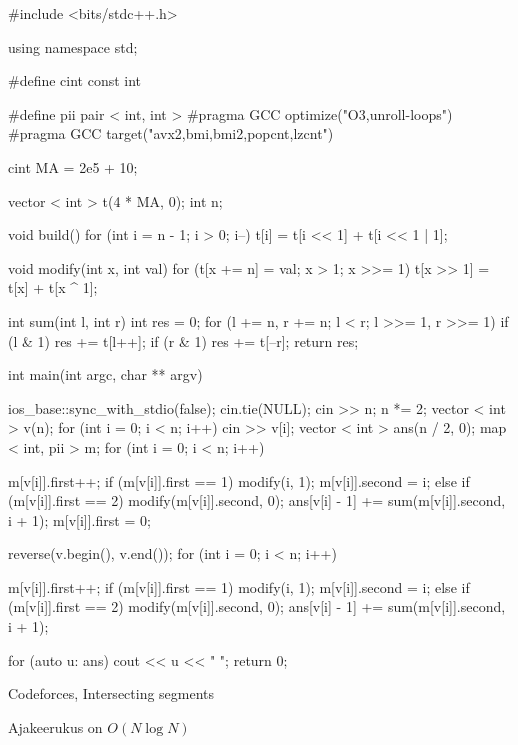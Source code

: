 \documentclass{trkut}
\begin{document}
\begin{cclol}
#include <bits/stdc++.h>

using namespace std;

#define cint
const int

#define pii pair < int, int >
#pragma GCC optimize("O3,unroll-loops")
#pragma GCC target("avx2,bmi,bmi2,popcnt,lzcnt")

cint MA = 2e5 + 10;

vector < int > t(4 * MA, 0);
int n;

void build() {
  for (int i = n - 1; i > 0; i--) {
    t[i] = t[i << 1] + t[i << 1 | 1];
  }
}

void modify(int x, int val) {
  for (t[x += n] = val; x > 1; x >>= 1) t[x >> 1] = t[x] + t[x ^ 1];
}

int sum(int l, int r) {
  int res = 0;
  for (l += n, r += n; l < r; l >>= 1, r >>= 1) {
    if (l & 1) res += t[l++];
    if (r & 1) res += t[--r];
  }
  return res;
}

int main(int argc, char ** argv) {
  ios_base::sync_with_stdio(false);
  cin.tie(NULL);
  cin >> n;
  n *= 2;
  vector < int > v(n);
  for (int i = 0; i < n; i++) cin >> v[i];
  vector < int > ans(n / 2, 0);
  map < int, pii > m;
  for (int i = 0; i < n; i++) {
    m[v[i]].first++;
    if (m[v[i]].first == 1) {
      modify(i, 1);
      m[v[i]].second = i;
    } else if (m[v[i]].first == 2) {
      modify(m[v[i]].second, 0);
      ans[v[i] - 1] += sum(m[v[i]].second, i + 1);
      m[v[i]].first = 0;
    }

  }
  reverse(v.begin(), v.end());
  for (int i = 0; i < n; i++) {
    m[v[i]].first++;
    if (m[v[i]].first == 1) {
      modify(i, 1);
      m[v[i]].second = i;
    } else if (m[v[i]].first == 2) {
      modify(m[v[i]].second, 0);
      ans[v[i] - 1] += sum(m[v[i]].second, i + 1);
    }

  }

  for (auto u: ans) {
    cout << u << " ";
  }
  return 0;
}
    \end{cclol}
    \begin{kk}[H]
    \caption{Codeforces, Intersecting segments}%
    \end{kk}
Ajakeerukus on $O(N\log N)$
\end{document}
